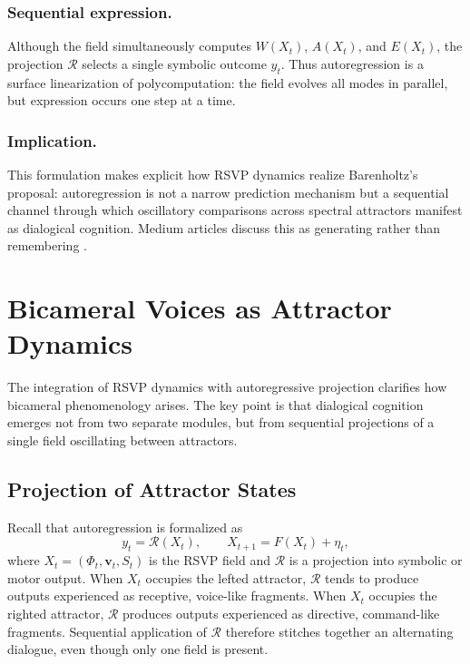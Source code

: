 \documentclass[a4paper,11pt]{article}
\begin{document}
\subsubsection{Sequential expression.}  
Although the field simultaneously computes $W(X_t)$, $A(X_t)$, and $E(X_t)$, the projection $\mathcal{R}$ selects a single symbolic outcome $y_t$.  
Thus autoregression is a surface linearization of polycomputation: the field evolves all modes in parallel, but expression occurs one step at a time.  

\subsubsection{Implication.}  
This formulation makes explicit how RSVP dynamics realize Barenholtz’s proposal: autoregression is not a narrow prediction mechanism but a sequential channel through which oscillatory comparisons across spectral attractors manifest as dialogical cognition. Medium articles discuss this as generating rather than remembering \citep{mediumautoregression}.

\section{Bicameral Voices as Attractor Dynamics}
\label{sec:bicameral-voices}

The integration of RSVP dynamics with autoregressive projection clarifies how
bicameral phenomenology arises. The key point is that dialogical cognition
emerges not from two separate modules, but from sequential projections of a
single field oscillating between attractors.

\subsection{Projection of Attractor States}
Recall that autoregression is formalized as
\begin{equation}
y_t = \mathcal{R}(X_t), \qquad 
X_{t+1} = F(X_t) + \eta_t,
\end{equation}
where $X_t=(\Phi_t,\mathbf{v}_t,S_t)$ is the RSVP field and $\mathcal{R}$ is a
projection into symbolic or motor output. When $X_t$ occupies the lefted
attractor, $\mathcal{R}$ tends to produce outputs experienced as receptive,
voice-like fragments. When $X_t$ occupies the righted attractor, $\mathcal{R}$
produces outputs experienced as directive, command-like fragments. Sequential
application of $\mathcal{R}$ therefore stitches together an alternating
dialogue, even though only one field is present.
\end{document}

